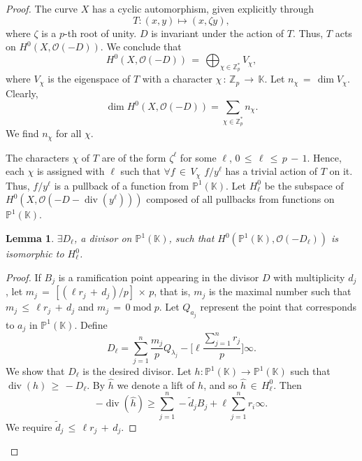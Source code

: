 \documentclass[10pt,a4paper]{amsart}
\newtheorem{lemma}{Lemma}
\DeclareMathOperator{\divOp}{div}
\DeclareMathOperator{\modOp}{mod}
\begin{document}
\begin{proof}
The curve $X$ has a cyclic automorphism, given explicitly through 
$$T:(x,y)\mapsto (x,\zeta y),$$ 
where $\zeta$ is a $p$-th root of unity. 
$D$ is invariant under the action of $T$. Thus,  $T$ acts on $H^{0}(X,\mathcal{O}(-D))$.
We conclude that 
$$H^{0}(X,\mathcal{O}(-D)) \,{=}\,\bigoplus_{\chi\in \mathbb{Z}_p^{\ast}} V_{\chi},$$
where $V_{\chi}$ is the eigenspace of $T$ with a character 
$\chi\,{:}\,{\mathbb{Z}_p} \,{\to}\, \mathbb{K}$. 
Let $n_{\chi}\,{=}\,\dim V_{\chi}$. Clearly, 
$$\dim H^{0}(X,\mathcal{O}(-D)) = \sum_{\chi\in \mathbb{Z}_p^{\ast}} n_{\chi}.$$ 
We  find $n_{\chi}$ for all $\chi$.

 The characters $\chi$ of $T$ are of the form $\zeta^{\ell}$ for some $\ell$,
$0\,{\leq}\, \ell \,{\leq}\, p\,{-}\,1$. Hence, each $\chi$ is assigned with 
$\ell$ such that $\forall f \,{\in}\, V_{\chi}$ $f/y^{\ell}$ has a trivial action of $T$ on it. 
Thus, $f/y^{\ell}$ is a pullback of a function from $\mathbb{P}^{1}(\mathbb{K})$.
Let $H_{\ell}^{0}$ be the subspace of $H^0(X,\mathcal{O}(-D-\divOp(y^{\ell})))$ 
composed of all pullbacks from functions on $\mathbb{P}^{1}(\mathbb{K}).$
\begin{lemma}
$\exists D_{\ell}$, a divisor on $\mathbb{P}^{1}(\mathbb{K})$, 
such that $H^{0}(\mathbb{P}^{1}(\mathbb{K}),\mathcal{O}(-D_{\ell}))$ is isomorphic to $H^{0}_{\ell}$.
\end{lemma}
\begin{proof}
If $B_j$ is a ramification point appearing in the divisor $D$
with multiplicity $d_j$, 
let $m_j\,{=}\,[(\ell r_j\,{+}\,d_j)/p ]\,{\times}\, p$, that is,  $m_j$ is the maximal number such that 
$m_j \,{\leq}\, \ell r_j\,{+}\,d_j$ and $m_j \,{=}\, 0 \modOp p$. 
Let  $Q_{a_j}$ represent the point that corresponds 
to $a_j$ in $\mathbb{P}^{1}(\mathbb{K})$. Define
\begin{equation}
D_{\ell} = \sum_{j=1}^n \frac{m_j}{p} Q_{\lambda_j}-
\bigg[\ell \frac{\sum_{j=1}^n r_j}{p}\bigg] \infty.
\end{equation} 
We show that $D_{\ell}$ is the desired divisor. Let $h:\mathbb{P}^{1}(\mathbb{K})\to \mathbb{P}^{1}(\mathbb{K})$ 
such that $\divOp (h) \,{\geq}\, {-} D_{\ell}$.  By $\widehat{h}$ we denote a lift of $h$, 
and so $\widehat{h} \,{\in}\, H_{\ell}^{0}$.  Then
\begin{equation}
-\divOp (\widehat{h})\geq \sum_{j=1}^n -\tilde{d}_j B_j+ \ell \sum_{j=1}^n  r_i\infty.
\end{equation}
We require $\tilde{d}_j \,{\leq}\, \ell r_j \,{+}\, d_j$. 


\end{proof}
\end{proof}
\end{document}
